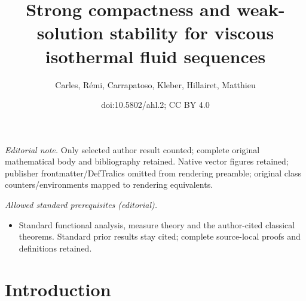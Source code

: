 \documentclass[10pt]{amsart}
\title{Strong compactness and weak-solution stability for viscous isothermal fluid sequences}
\author{Carles, Rémi, Carrapatoso, Kleber, Hillairet, Matthieu}
\date{doi:10.5802/ahl.2; CC BY 4.0}
\theoremstyle{definition}\newtheorem{defi}[theo]{Definition}\newtheorem{rema}[theo]{Remark}\newtheorem{exam}[theo]{Example}\newtheorem{exem}[theo]{Example}\newtheorem{nota}[theo]{Notation}
\newcommand*\<{\left\langle}
\renewcommand*\>{\right\rangle}
\begin{document}
\maketitle
\noindent\textit{Editorial note.} Only selected author result counted; complete original mathematical body and bibliography retained. Native vector figures retained; publisher frontmatter/DefTralics omitted from rendering preamble; original class counters/environments mapped to rendering equivalents.\par\medskip
\noindent\textit{Allowed standard prerequisites (editorial).}\begin{itemize}
\item Standard functional analysis, measure theory and the author-cited classical theorems. Standard prior results stay cited; complete source-local proofs and definitions retained.
\end{itemize}\medskip

\section{Introduction}\label{sec:intro}
\end{document}
